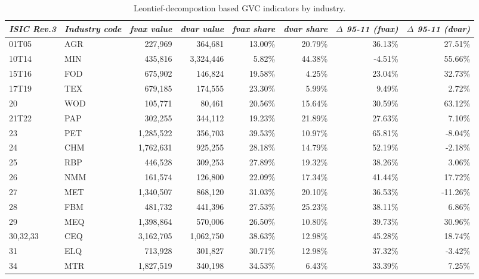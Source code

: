 \documentclass[a4paper,11pt]{article}
\begin{document}
\begin{table}[h]\small
  \centering
         \caption{Leontief-decompostion based GVC indicators by industry.}
    \hspace*{-2.8cm}
    \begin{tabular}{llrrrrrr}
    \toprule
   \multicolumn{1}{l}{\textit{ISIC Rev.3}} &  \multicolumn{1}{l}{\textit{Industry code}} & \multicolumn{1}{c}{\textit{fvax value}} & \multicolumn{1}{c}{\textit{dvar value}} & \multicolumn{1}{c}{\textit{fvax share}} & \multicolumn{1}{c}{\textit{dvar share}} & \multicolumn{1}{c}{\textit{$\Delta$ 95-11 (fvax)}} & \multicolumn{1}{c}{\textit{$\Delta$ 95-11  (dvar)}} \\
    \midrule
   01T05 & AGR   & 227,969 & 364,681 & 13.00\% & 20.79\% & 36.13\% & 27.51\% \\
    10T14 & MIN   & 435,816 & 3,324,446 & 5.82\% & 44.38\% & -4.51\% & 55.66\% \\
    15T16 & FOD   & 675,902 & 146,824 & 19.58\% & 4.25\% & 23.04\% & 32.73\% \\
    17T19 & TEX   & 679,185 & 174,555 & 23.30\% & 5.99\% & 9.49\% & 2.72\% \\
    20    & WOD   & 105,771 & 80,461 & 20.56\% & 15.64\% & 30.59\% & 63.12\% \\
    21T22 & PAP   & 302,255 & 344,112 & 19.23\% & 21.89\% & 27.63\% & 7.10\% \\
    23    & PET   & 1,285,522 & 356,703 & 39.53\% & 10.97\% & 65.81\% & -8.04\% \\
    24    & CHM   & 1,762,631 & 925,255 & 28.18\% & 14.79\% & 52.19\% & -2.18\% \\
    25    & RBP   & 446,528 & 309,253 & 27.89\% & 19.32\% & 38.26\% & 3.06\% \\
    26    & NMM   & 161,574 & 126,800 & 22.09\% & 17.34\% & 41.44\% & 17.72\% \\
    27    & MET   & 1,340,507 & 868,120 & 31.03\% & 20.10\% & 36.53\% & -11.26\% \\
    28    & FBM   & 481,732 & 441,396 & 27.53\% & 25.23\% & 38.11\% & 6.86\% \\
    29    & MEQ   & 1,398,864 & 570,006 & 26.50\% & 10.80\% & 39.73\% & 30.96\% \\
    30,32,33 & CEQ   & 3,162,705 & 1,062,750 & 38.63\% & 12.98\% & 45.28\% & 18.74\% \\
    31    & ELQ   & 713,928 & 301,827 & 30.71\% & 12.98\% & 37.32\% & -3.42\% \\
    34    & MTR   & 1,827,519 & 340,198 & 34.53\% & 6.43\% & 33.39\% & 7.25\% \\

\end{tabular}
\end{table}
\end{document}
